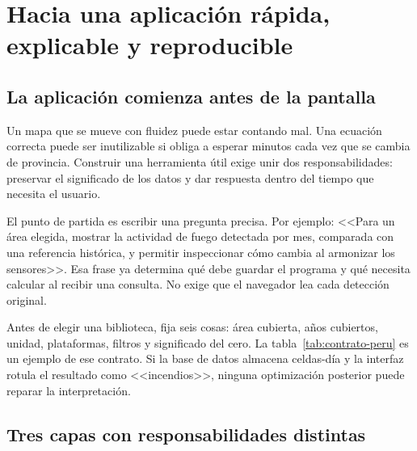 \chapter{Hacia una aplicación rápida, explicable y reproducible}\label{cap:aplicacion}


\FloatBarrier
\section{La aplicación comienza antes de la pantalla}

Un mapa que se mueve con fluidez puede estar contando mal. Una ecuación correcta puede ser
inutilizable si obliga a esperar minutos cada vez que se cambia de provincia. Construir
una herramienta útil exige unir dos responsabilidades: preservar el significado de los
datos y dar respuesta dentro del tiempo que necesita el usuario.

El punto de partida es escribir una pregunta precisa. Por ejemplo: <<Para un área elegida,
mostrar la actividad de fuego detectada por mes, comparada con una referencia histórica,
y permitir inspeccionar cómo cambia al armonizar los sensores>>. Esa frase ya determina
qué debe guardar el programa y qué necesita calcular al recibir una consulta. No exige
que el navegador lea cada detección original.

Antes de elegir una biblioteca, fija seis cosas: área cubierta, años cubiertos, unidad,
plataformas, filtros y significado del cero. La tabla~\ref{tab:contrato-peru} es un ejemplo
de ese contrato. Si la base de datos almacena celdas-día y la interfaz rotula el resultado
como <<incendios>>, ninguna optimización posterior puede reparar la interpretación.

\FloatBarrier
\section{Tres capas con responsabilidades distintas}

